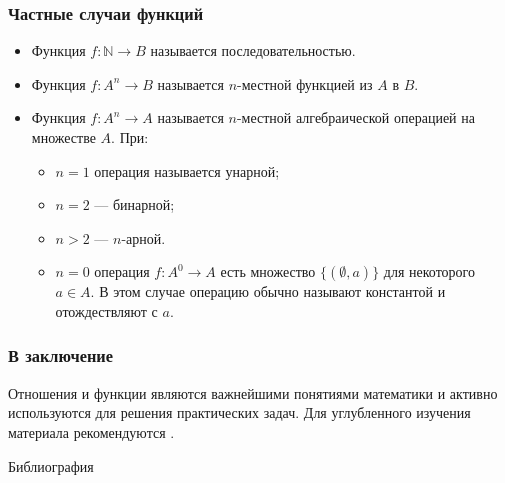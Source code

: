 \begin{frame}
    \frametitle{Частные случаи функций}
    
    \begin{itemize}
        \item Функция $f:\mathbb{N}\to B$ называется \alert{последовательностью}.

        \item Функция $f:A^n\to B$ называется \alert{$n$-местной функцией} из $A$ в $B$. 

        \item Функция $f:A^n\to A$ называется \alert{$n$-местной алгебраической операцией} на множестве $A$. При:
        \begin{itemize}
            \item $n=1$ операция называется \alert{унарной}; 
            \item $n=2$ --- \alert{бинарной};
            \item $n>2$ --- $n$-арной. 
            \item $n=0$ операция $f:A^0\to A$ есть множество $\{(\emptyset,a)\}$ для некоторого $a\in A$. В этом случае операцию обычно называют \alert{константой} и отождествляют с $a$.
        \end{itemize}
    \end{itemize}
\end{frame}



\appendix


\begin{frame}
    \frametitle{В заключение}
    
    Отношения и функции являются важнейшими понятиями математики и активно используются для решения практических задач. Для углубленного изучения материала рекомендуются \cite{bib:sudoplatov:discrmath, bib:haggard:discrmathprogrammer}.
\end{frame}


\begin{frame}[allowframebreaks]{Библиография}
    
    
\end{frame}

